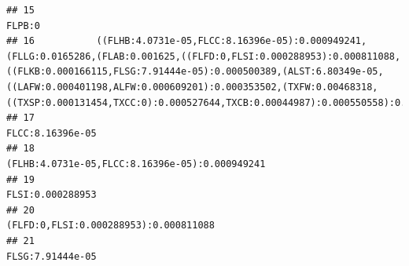 \documentclass[]{article}
\begin{document}
\begin{verbatim}
## 15                                                                                                                                                                                                                                                                                                                                                                                                                           FLPB:0
## 16           ((FLHB:4.0731e-05,FLCC:8.16396e-05):0.000949241,(FLLG:0.0165286,(FLAB:0.001625,((FLFD:0,FLSI:0.000288953):0.000811088,((FLKB:0.000166115,FLSG:7.91444e-05):0.000500389,(ALST:6.80349e-05,((LAFW:0.000401198,ALFW:0.000609201):0.000353502,(TXFW:0.00468318,((TXSP:0.000131454,TXCC:0):0.000527644,TXCB:0.00044987):0.000550558):0.00263375):0.000535248):0.0026018):0.000242145):0.00153256):0.00951218):0.00146329):0
## 17                                                                                                                                                                                                                                                                                                                                                                                                                 FLCC:8.16396e-05
## 18                                                                                                                                                                                                                                                                                                                                                                                   (FLHB:4.0731e-05,FLCC:8.16396e-05):0.000949241
## 19                                                                                                                                                                                                                                                                                                                                                                                                                 FLSI:0.000288953
## 20                                                                                                                                                                                                                                                                                                                                                                                            (FLFD:0,FLSI:0.000288953):0.000811088
## 21                                                                                                                                                                                                                                                                                                                                                                                                                 FLSG:7.91444e-05

\end{verbatim}
\end{document}
